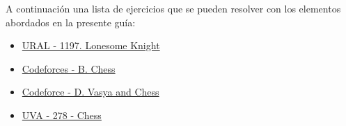 A continuación una lista de ejercicios que se pueden resolver con los elementos abordados en la presente guía:

\begin{itemize}
	\item \href{https://acm.timus.ru/problem.aspx?space=1&num=1197}{URAL - 1197. Lonesome Knight}
	\item \href{https://codeforces.com/problemset/problem/38/B}{Codeforces - B. Chess}
	\item \href{https://codeforces.com/problemset/problem/493/D}{Codeforce - D. Vasya and Chess}
	\item \href{https://onlinejudge.org/index.php?option=onlinejudge&page=show_problem&problem=214}{UVA - 278 - Chess}
\end{itemize}